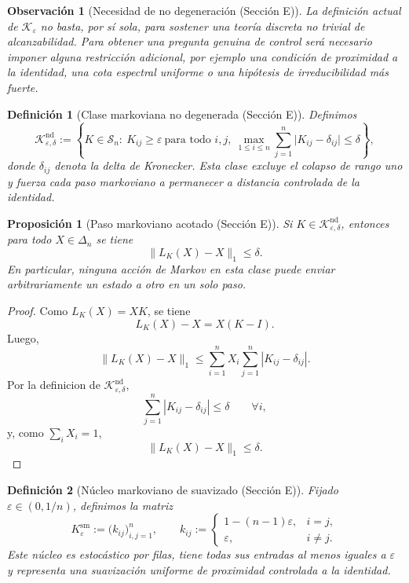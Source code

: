 ﻿\documentclass[12pt]{article}
\newcommand{\fuente}[1]{\textnormal{(#1)}}
\newtheorem{definicion}{Definición}[section]
\newtheorem{proposicion}{Proposición}[section]
\newtheorem{observacion}{Observación}[section]
\begin{document}
\begin{observacion}[Necesidad de no degeneración \fuente{Sección E}]
La definición actual de \(\mathcal K_\varepsilon\) no basta, por sí sola, para sostener una teoría discreta no trivial de alcanzabilidad. Para obtener una pregunta genuina de control será necesario imponer alguna restricción adicional, por ejemplo una condición de proximidad a la identidad, una cota espectral uniforme o una hipótesis de irreducibilidad más fuerte.
\end{observacion}

\begin{definicion}[Clase markoviana no degenerada \fuente{Sección E}]
Definimos
\[
\mathcal K_{\varepsilon,\delta}^{\mathrm{nd}}
:=
\left\{
K\in\mathcal S_n:\ 
K_{ij}\ge \varepsilon\ \text{para todo }i,j,
\ \max_{1\le i\le n}\sum_{j=1}^n \bigl|K_{ij}-\delta_{ij}\bigr|\le \delta
\right\},
\]
donde \(\delta_{ij}\) denota la delta de Kronecker. Esta clase excluye el colapso de rango uno y fuerza cada paso markoviano a permanecer a distancia controlada de la identidad.
\end{definicion}

\begin{proposicion}[Paso markoviano acotado \fuente{Sección E}]
Si \(K\in\mathcal K_{\varepsilon,\delta}^{\mathrm{nd}}\), entonces para todo \(X\in\Delta_n\) se tiene
\[
\|L_K(X)-X\|_1\le \delta.
\]
En particular, ninguna acción de Markov en esta clase puede enviar arbitrariamente un estado a otro en un solo paso.
\end{proposicion}

\begin{proof}
Como \(L_K(X)=XK\), se tiene
\[
L_K(X)-X=X(K-I).
\]
Luego,
\[
\|L_K(X)-X\|_1
\le
\sum_{i=1}^n X_i\sum_{j=1}^n |K_{ij}-\delta_{ij}|.
\]
Por la definicion de \(\mathcal K_{\varepsilon,\delta}^{\mathrm{nd}}\),
\[
\sum_{j=1}^n |K_{ij}-\delta_{ij}|\le \delta
\qquad \forall i,
\]
y, como \(\sum_i X_i=1\),
\[
\|L_K(X)-X\|_1\le \delta.
\]
\end{proof}

\begin{definicion}[Núcleo markoviano de suavizado \fuente{Sección E}]
Fijado \(\varepsilon\in(0,1/n)\), definimos la matriz
\[
K_\varepsilon^{\mathrm{sm}}
:=
\bigl(k_{ij}\bigr)_{i,j=1}^n,
\qquad
k_{ij}:=
\begin{cases}
1-(n-1)\varepsilon, & i=j,\\
\varepsilon, & i\neq j.
\end{cases}
\]
Este núcleo es estocástico por filas, tiene todas sus entradas al menos iguales a \(\varepsilon\) y representa una suavización uniforme de proximidad controlada a la identidad.
\end{definicion}
\end{document}
